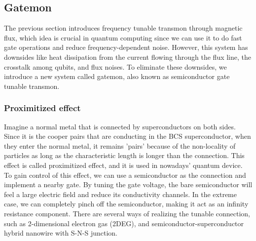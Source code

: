 \subsection{Gatemon}

The previous section introduces frequency tunable transmon through magnetic flux, which idea is crucial in quantum computing since we can use it to do fast gate operations and reduce frequency-dependent noise\cite{RN29}. However, this system has downsides like heat dissipation from the current flowing through the flux line, the crosstalk among qubits, and flux noises\cite{RN28}. To eliminate these downsides, we introduce a new system called gatemon, also known as semiconductor gate tunable transmon\cite{RN73}.
\subsubsection{Proximitized effect}
Imagine a normal metal that is connected by superconductors on both sides. Since it is the cooper pairs that are conducting in the BCS superconductor, when they enter the normal metal, it remains 'pairs' because of the non-locality of particles as long as the characteristic length is longer than the connection\cite{RN32}. This effect is called proximitized effect, and it is used in nowadays' quantum device\cite{RN33}. To gain control of this effect, we can use a semiconductor as the connection and implement a nearby gate. By tuning the gate voltage, the bare semiconductor will feel a large electric field and reduce its conductivity channels. In the extreme case, we can completely pinch off the semiconductor, making it act as an infinity resistance component. There are several ways of realizing the tunable connection, such as 2-dimensional electron gas (2DEG), and semiconductor-superconductor hybrid nanowire with S-N-S junction.

